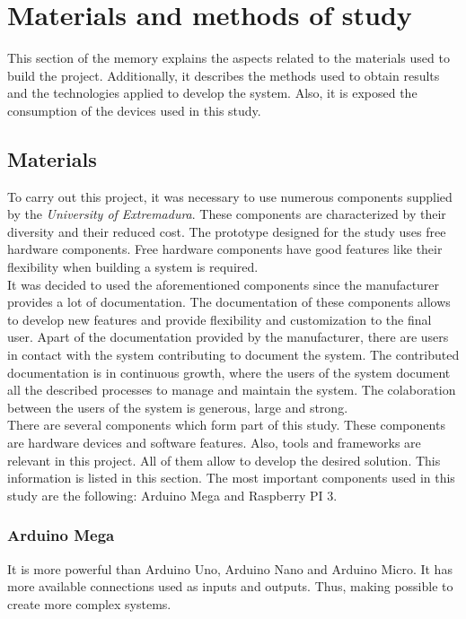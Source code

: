 
\chapter{Materials and methods of study}
\newpage

This section of the memory explains the aspects related to the materials used to build the project. Additionally, it describes the methods used to obtain results and the technologies applied to develop the system. Also, it is exposed the consumption of the devices used in this study. 

\section{Materials}

To carry out this project, it was necessary to use numerous components supplied by the \textit{University of Extremadura}. These components are characterized by their diversity and their reduced cost. The prototype designed for the study uses free hardware components. Free hardware components have good features like their flexibility when building a system is required.\\

It was decided to used the aforementioned components since the manufacturer provides a lot of documentation. The documentation of these components allows to develop new features and provide flexibility and customization to the final user. Apart of the documentation provided by the manufacturer, there are users in contact with the system contributing to document the system. The contributed documentation is in continuous growth, where the users of the system document all the described processes to manage and maintain the system. The colaboration between the users of the system is generous, large and strong.\\

There are several components which form part of this study. These components are hardware devices and software features. Also, tools and frameworks are relevant in this project. All of them allow to develop the desired solution. This information is listed in this section. The most important components used in this study are the following: Arduino Mega and Raspberry PI 3.

\subsection{Arduino Mega}

It is more powerful than Arduino Uno, Arduino Nano and Arduino Micro. It has more available connections used as inputs and outputs. Thus, making possible to create more complex systems.\\

